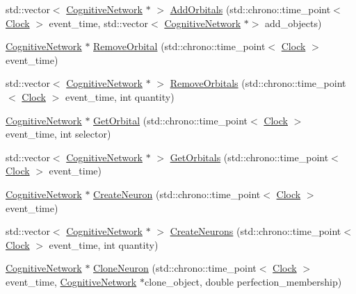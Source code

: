 \begin{DoxyCompactItemize}
\item 
std\+::vector$<$ \hyperlink{class_cognitive_network}{Cognitive\+Network} $\ast$ $>$ \hyperlink{class_cognitive_network_a9dbf4a9fab3b806d2bd6b2701b7a9548}{Add\+Orbitals} (std\+::chrono\+::time\+\_\+point$<$ \hyperlink{universe_8h_a0ef8d951d1ca5ab3cfaf7ab4c7a6fd80}{Clock} $>$ event\+\_\+time, std\+::vector$<$ \hyperlink{class_cognitive_network}{Cognitive\+Network} $\ast$$>$ add\+\_\+objects)
\item 
\hyperlink{class_cognitive_network}{Cognitive\+Network} $\ast$ \hyperlink{class_cognitive_network_a6ed0e198f6dcfdd45d57df5d3ad5754c}{Remove\+Orbital} (std\+::chrono\+::time\+\_\+point$<$ \hyperlink{universe_8h_a0ef8d951d1ca5ab3cfaf7ab4c7a6fd80}{Clock} $>$ event\+\_\+time)
\item 
std\+::vector$<$ \hyperlink{class_cognitive_network}{Cognitive\+Network} $\ast$ $>$ \hyperlink{class_cognitive_network_af7834d400995607c2a5a5eac7b5e006d}{Remove\+Orbitals} (std\+::chrono\+::time\+\_\+point$<$ \hyperlink{universe_8h_a0ef8d951d1ca5ab3cfaf7ab4c7a6fd80}{Clock} $>$ event\+\_\+time, int quantity)
\item 
\hyperlink{class_cognitive_network}{Cognitive\+Network} $\ast$ \hyperlink{class_cognitive_network_a69655ef1e12bac5f74c2eb85c72720f4}{Get\+Orbital} (std\+::chrono\+::time\+\_\+point$<$ \hyperlink{universe_8h_a0ef8d951d1ca5ab3cfaf7ab4c7a6fd80}{Clock} $>$ event\+\_\+time, int selector)
\item 
std\+::vector$<$ \hyperlink{class_cognitive_network}{Cognitive\+Network} $\ast$ $>$ \hyperlink{class_cognitive_network_aa21d28ffc3b507236a7dad64663f6c42}{Get\+Orbitals} (std\+::chrono\+::time\+\_\+point$<$ \hyperlink{universe_8h_a0ef8d951d1ca5ab3cfaf7ab4c7a6fd80}{Clock} $>$ event\+\_\+time)
\item 
\hyperlink{class_cognitive_network}{Cognitive\+Network} $\ast$ \hyperlink{class_cognitive_network_a9b5fcaf824d5b587775e7c44630affe6}{Create\+Neuron} (std\+::chrono\+::time\+\_\+point$<$ \hyperlink{universe_8h_a0ef8d951d1ca5ab3cfaf7ab4c7a6fd80}{Clock} $>$ event\+\_\+time)
\item 
std\+::vector$<$ \hyperlink{class_cognitive_network}{Cognitive\+Network} $\ast$ $>$ \hyperlink{class_cognitive_network_af9b2a136584c962e44114a7ee3d2804a}{Create\+Neurons} (std\+::chrono\+::time\+\_\+point$<$ \hyperlink{universe_8h_a0ef8d951d1ca5ab3cfaf7ab4c7a6fd80}{Clock} $>$ event\+\_\+time, int quantity)
\item 
\hyperlink{class_cognitive_network}{Cognitive\+Network} $\ast$ \hyperlink{class_cognitive_network_abf42d64965d64836d6fcbd7ce33c8db4}{Clone\+Neuron} (std\+::chrono\+::time\+\_\+point$<$ \hyperlink{universe_8h_a0ef8d951d1ca5ab3cfaf7ab4c7a6fd80}{Clock} $>$ event\+\_\+time, \hyperlink{class_cognitive_network}{Cognitive\+Network} $\ast$clone\+\_\+object, double perfection\+\_\+membership)
$$
\end{DoxyCompactItemize}
